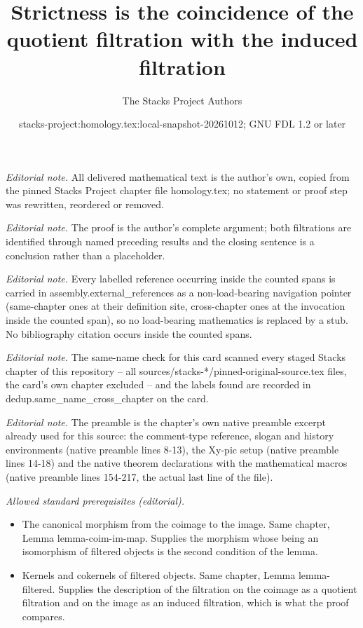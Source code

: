 \documentclass[10pt,a4paper]{amsart}
\title{Strictness is the coincidence of the quotient filtration with the induced filtration}
\author{The Stacks Project Authors}
\date{stacks-project:homology.tex:local-snapshot-20261012; GNU FDL 1.2 or later}
\theoremstyle{plain}
\theoremstyle{definition}
\theoremstyle{remark}
\numberwithin{equation}{subsection}
\begin{document}
\maketitle
\noindent\textit{Editorial note.} All delivered mathematical text is the author's own, copied from the pinned Stacks Project chapter file homology.tex; no statement or proof step was rewritten, reordered or removed.\par\medskip
\noindent\textit{Editorial note.} The proof is the author's complete argument; both filtrations are identified through named preceding results and the closing sentence is a conclusion rather than a placeholder.\par\medskip
\noindent\textit{Editorial note.} Every labelled reference occurring inside the counted spans is carried in assembly.external\_references as a non-load-bearing navigation pointer (same-chapter ones at their definition site, cross-chapter ones at the invocation inside the counted span), so no load-bearing mathematics is replaced by a stub. No bibliography citation occurs inside the counted spans.\par\medskip
\noindent\textit{Editorial note.} The same-name check for this card scanned every staged Stacks chapter of this repository -- all sources/stacks-*/pinned-original-source.tex files, the card's own chapter excluded -- and the labels found are recorded in dedup.same\_name\_cross\_chapter on the card.\par\medskip
\noindent\textit{Editorial note.} The preamble is the chapter's own native preamble excerpt already used for this source: the comment-type reference, slogan and history environments (native preamble lines 8-13), the Xy-pic setup (native preamble lines 14-18) and the native theorem declarations with the mathematical macros (native preamble lines 154-217, the actual last line of the file).\par\medskip
\noindent\textit{Allowed standard prerequisites (editorial).}\begin{itemize}
\item The canonical morphism from the coimage to the image. Same chapter, Lemma lemma-coim-im-map. Supplies the morphism whose being an isomorphism of filtered objects is the second condition of the lemma.
\item Kernels and cokernels of filtered objects. Same chapter, Lemma lemma-filtered. Supplies the description of the filtration on the coimage as a quotient filtration and on the image as an induced filtration, which is what the proof compares.
\end{itemize}\medskip
\end{document}
